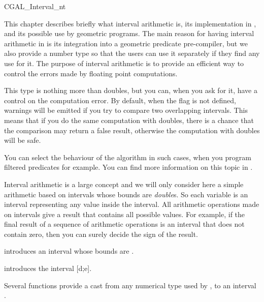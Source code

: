 
\begin{ccClass} {CGAL_Interval_nt}
\label{interval}

This chapter describes briefly what interval arithmetic is, its implementation
in {\cgal}, and its possible use by geometric programs.
The main reason for having interval arithmetic in {\cgal} is its integration
into a geometric predicate pre-compiler, but we also provide a number type so
that the users can use it separately if they find any use for it.
The purpose of interval arithmetic is to provide an efficient way to
control the errors made by floating point computations.

This type is nothing more than doubles, but you can, when you ask for it, have
a control on the computation error.
By default, when the flag  is not defined, warnings
will be emitted if you try to compare two overlapping intervals.  This means
that if you do the same computation with doubles, there is a chance that the
comparison may return a false result, otherwise the computation with doubles
will be safe.

You can select the behaviour of the algorithm in such cases, when you program
filtered predicates for example.  You can find more information on this topic
in \cite{bbp-iayed-98scg}.

\ccDefinition
Interval arithmetic is a large concept and we will only consider here a 
simple arithmetic based on intervals whose bounds are {\it double}s.
So each variable is an interval representing any value inside the interval.
All arithmetic operations made on intervals give a result that contains all
possible values.
For example, if the final result of a sequence of arithmetic operations is
an interval that does not contain zero, then you can surely decide the sign 
of the result.


\ccCreation

 {introduces an interval
whose bounds are .}

{introduces the interval [d;e].}

Several functions  provide a cast from any
numerical type used by {\cgal}, to an interval .



\end{ccClass}
